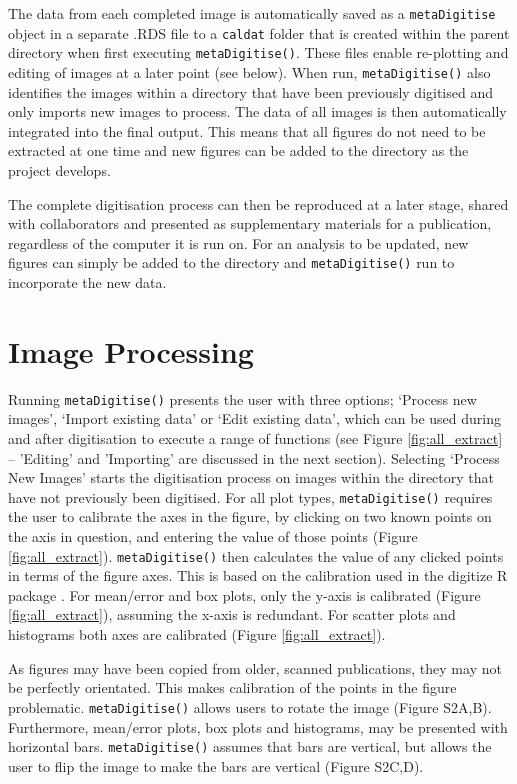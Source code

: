 \documentclass[12pt]{article}
\newcommand{\code}[1]{\texttt{#1}}
\newcommand{\fct}[1]{\texttt{#1()}}
\newcommand{\pkg}[1]{{\fontseries{b}\selectfont #1}}
\begin{document}
The data from each completed image is automatically saved as a \code{metaDigitise} object in a separate .RDS file to a \code{caldat} folder that is created within the parent directory when first executing \fct{metaDigitise}. These files enable re-plotting and editing of images at a later point (see below). When run, \fct{metaDigitise} also identifies the images within a directory that have been previously digitised and only imports new images to process. The data of all images is then automatically integrated into the final output. This means that all figures do not need to be extracted at one time and new figures can be added to the directory as the project develops.

The complete digitisation process can then be reproduced at a later stage, shared with collaborators and presented as supplementary materials for a publication, regardless of the computer it is run on. For an analysis to be updated, new figures can simply be added to the directory and \fct{metaDigitise} run to incorporate the new data. 



\section{Image Processing}
Running \fct{metaDigitise} presents the user with three options; `Process new images', `Import existing data' or `Edit existing data', which can be used during and after digitisation to execute a range of functions (see Figure \ref{fig:all_extract} – 'Editing' and 'Importing' are discussed in the next section). Selecting `Process New Images' starts the digitisation process on images within the directory that have not previously been digitised. For all plot types, \fct{metaDigitise} requires the user to calibrate the axes in the figure, by clicking on two known points on the axis in question, and entering the value of those points (Figure \ref{fig:all_extract}). \fct{metaDigitise} then calculates the value of any clicked points in terms of the figure axes. This is based on the calibration used in the \pkg{digitize} R package \citep{Poisot2011}. For mean/error and box plots, only the y-axis is calibrated (Figure \ref{fig:all_extract}), assuming the x-axis is redundant. For scatter plots and histograms both axes are calibrated (Figure \ref{fig:all_extract}).

As figures may have been copied from older, scanned publications, they may not be perfectly orientated. This makes calibration of the points in the figure problematic. \fct{metaDigitise} allows users to rotate the image (Figure S2A,B). Furthermore, mean/error plots, box plots and histograms, may be presented with horizontal bars. \fct{metaDigitise} assumes that bars are vertical, but allows the user to flip the image to make the bars are vertical (Figure S2C,D).
\end{document}
